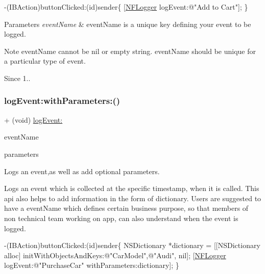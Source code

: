\begin{DoxyCode}
-(IBAction)buttonClicked:(\textcolor{keywordtype}{id})sender\{
 [\hyperlink{interface_n_f_logger}{NFLogger} logEvent:\textcolor{stringliteral}{@"Add to Cart"}];
\}
\end{DoxyCode}
 
\begin{DoxyParams}{Parameters}
{\em event\+Name} & event\+Name is a unique key defining your event to be logged. \\
\hline
\end{DoxyParams}
\begin{DoxyNote}{Note}
event\+Name cannot be nil or empty string. event\+Name should be unique for a particular type of event. 
\end{DoxyNote}
\begin{DoxySince}{Since}
1.. 
\end{DoxySince}
\mbox{\label{interface_n_f_logger_a0135c2e9b6e8d0241bbbb3383a2ed310}} 
\subsubsection{\texorpdfstring{log\+Event\+:with\+Parameters\+:()}{logEvent:withParameters:()}}
{\footnotesize\ttfamily + (void) \hyperlink{interface_n_f_logger_a932bba0925a8ffefec035de7f3cff73a}{log\+Event\+:} \begin{DoxyParamCaption}\item[{(N\+S\+String $\ast$)}]{event\+Name }\item[{withParameters:(N\+S\+Dictionary $\ast$)}]{parameters }\end{DoxyParamCaption}}



Logs an event,as well as add optional parameters. 

Logs an event which is collected at the specific timestamp, when it is called. This api also helps to add information in the form of dictionary. Users are suggested to have a event\+Name which defines certain business purpose, so that members of non technical team working on app, can also understand when the event is logged.


\begin{DoxyCode}
-(IBAction)buttonClicked:(\textcolor{keywordtype}{id})sender\{
 NSDictionary *dictionary = [[NSDictionary alloc] initWithObjectsAndKeys:\textcolor{stringliteral}{@"CarModel"},\textcolor{stringliteral}{@"Audi"}, nil];
 [\hyperlink{interface_n_f_logger}{NFLogger} logEvent:\textcolor{stringliteral}{@"PurchaseCar"} withParameters:dictionary];
\}
\end{DoxyCode}
 

